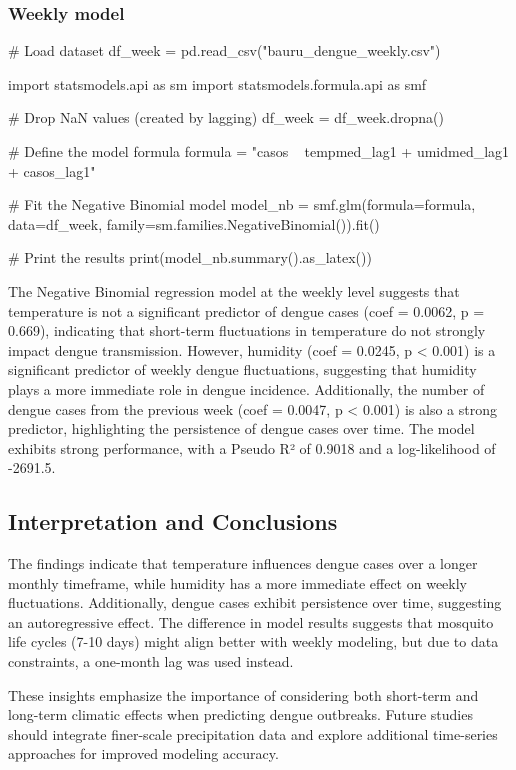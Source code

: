 \documentclass{article}
\begin{document}
\subsubsection*{Weekly model}

\begin{pycode}
# Load dataset
df_week = pd.read_csv("bauru_dengue_weekly.csv") 

import statsmodels.api as sm
import statsmodels.formula.api as smf

# Drop NaN values (created by lagging)
df_week = df_week.dropna()

# Define the model formula
formula = "casos ~ tempmed_lag1 + umidmed_lag1 + casos_lag1"

# Fit the Negative Binomial model
model_nb = smf.glm(formula=formula, data=df_week, 
                    family=sm.families.NegativeBinomial()).fit()

# Print the results
print(model_nb.summary().as_latex())

\end{pycode}

The Negative Binomial regression model at the weekly level suggests that temperature is not a significant predictor of dengue cases (coef = 0.0062, p = 0.669), indicating that short-term fluctuations in temperature do not strongly impact dengue transmission. However, humidity (coef = 0.0245, p < 0.001) is a significant predictor of weekly dengue fluctuations, suggesting that humidity plays a more immediate role in dengue incidence. Additionally, the number of dengue cases from the previous week (coef = 0.0047, p < 0.001) is also a strong predictor, highlighting the persistence of dengue cases over time. The model exhibits strong performance, with a Pseudo R² of 0.9018 and a log-likelihood of -2691.5.

\subsection*{Interpretation and Conclusions}

The findings indicate that temperature influences dengue cases over a longer monthly timeframe, while humidity has a more immediate effect on weekly fluctuations. Additionally, dengue cases exhibit persistence over time, suggesting an autoregressive effect. The difference in model results suggests that mosquito life cycles (7-10 days) might align better with weekly modeling, but due to data constraints, a one-month lag was used instead.

These insights emphasize the importance of considering both short-term and long-term climatic effects when predicting dengue outbreaks. Future studies should integrate finer-scale precipitation data and explore additional time-series approaches for improved modeling accuracy.
\end{document}
